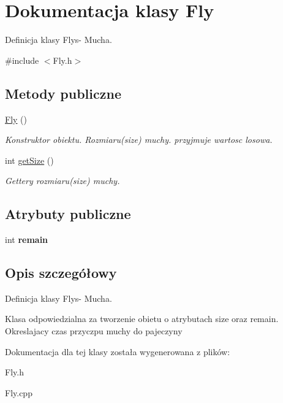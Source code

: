 \hypertarget{class_fly}{}\section{Dokumentacja klasy Fly}
\label{class_fly}


Definicja klasy Flys-\/ Mucha.  




{\ttfamily \#include $<$Fly.\+h$>$}

\subsection*{Metody publiczne}
\begin{DoxyCompactItemize}
\item 
\hyperlink{class_fly_ad6dcd83ebeba92269c17d06ef6a5e3fe}{Fly} ()\hypertarget{class_fly_ad6dcd83ebeba92269c17d06ef6a5e3fe}{}\label{class_fly_ad6dcd83ebeba92269c17d06ef6a5e3fe}

\begin{DoxyCompactList}\small\item\em Konstruktor obiektu. Rozmiaru(size) muchy. przyjmuje wartosc losowa. \end{DoxyCompactList}\item 
int \hyperlink{class_fly_a18db7b34ee2e8b025734e1b7c30d4afe}{get\+Size} ()\hypertarget{class_fly_a18db7b34ee2e8b025734e1b7c30d4afe}{}\label{class_fly_a18db7b34ee2e8b025734e1b7c30d4afe}

\begin{DoxyCompactList}\small\item\em Gettery rozmiaru(size) muchy. \end{DoxyCompactList}\end{DoxyCompactItemize}
\subsection*{Atrybuty publiczne}
\begin{DoxyCompactItemize}
\item 
int {\bfseries remain}\hypertarget{class_fly_a5e74d6f4b9af7f99763727f3cd51ba6a}{}\label{class_fly_a5e74d6f4b9af7f99763727f3cd51ba6a}

\end{DoxyCompactItemize}


\subsection{Opis szczegółowy}
Definicja klasy Flys-\/ Mucha. 

Klasa odpowiedzialna za tworzenie obietu o atrybutach size oraz remain. Okreslajacy czas przyczpu muchy do pajeczyny 

Dokumentacja dla tej klasy została wygenerowana z plików\+:\begin{DoxyCompactItemize}
\item 
Fly.\+h\item 
Fly.\+cpp\end{DoxyCompactItemize}
